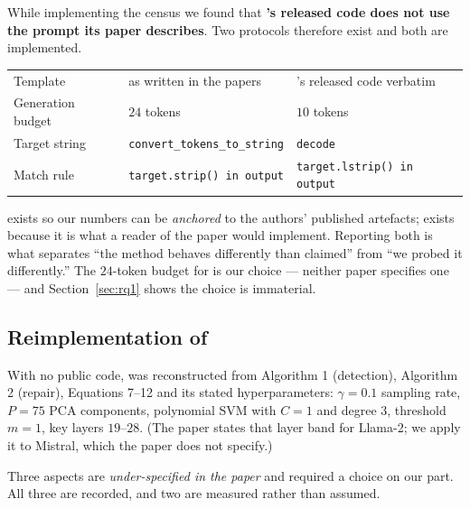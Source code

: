 While implementing the census we found that \textbf{\gc{}'s released code does not
use the prompt its paper describes}. Two protocols therefore exist and both are
implemented.

\begin{center}
\begin{tabular}{lll}
\toprule
& \Ppaper{} & \Pcode{} \\
\midrule
Template & as written in the papers & \gc{}'s released code verbatim \\
Generation budget & $24$ tokens & $10$ tokens \\
Target string & \texttt{convert\_tokens\_to\_string} & \texttt{decode} \\
Match rule & \texttt{target.strip() in output} & \texttt{target.lstrip() in output} \\
\bottomrule
\end{tabular}
\end{center}

\Pcode{} exists so our numbers can be \emph{anchored} to the authors' published
artefacts; \Ppaper{} exists because it is what a reader of the paper would
implement. Reporting both is what separates ``the method behaves differently than
claimed'' from ``we probed it differently.'' The $24$-token budget for \Ppaper{}
is our choice --- neither paper specifies one --- and Section~\ref{sec:rq1} shows
the choice is immaterial.

\subsection{Reimplementation of \gp{}}
\label{sec:gp-reimpl}

With no public code, \gp{} was reconstructed from Algorithm 1 (detection),
Algorithm 2 (repair), Equations 7--12 and its stated hyperparameters:
$\gamma = 0.1$ sampling rate, $P = 75$ PCA components, polynomial SVM with $C=1$
and degree $3$, threshold $m=1$, key layers $19$--$28$. (The paper states that
layer band for Llama-2; we apply it to Mistral, which the paper does not
specify.)

Three aspects are \emph{under-specified in the paper} and required a choice on
our part. All three are recorded, and two are measured rather than assumed.

